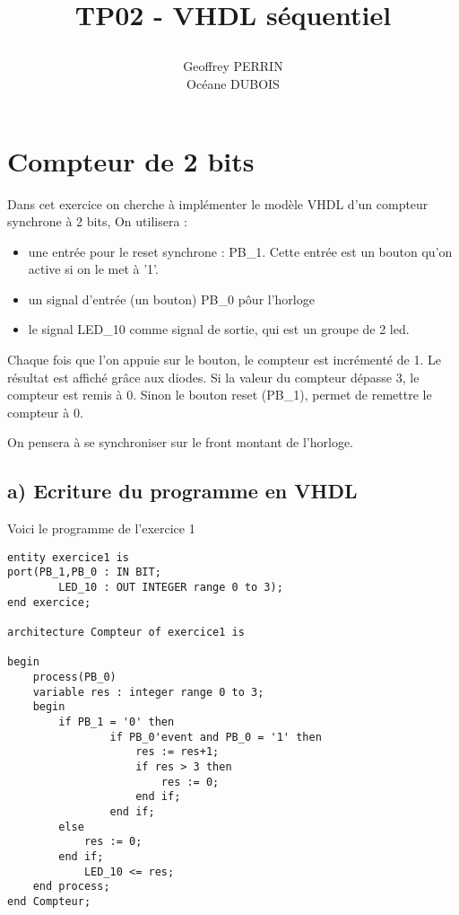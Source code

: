 \documentclass[11pt]{report}
\title{\textbf{TP02 - VHDL séquentiel}
\author{Geoffrey PERRIN \\ Océane DUBOIS\\}
\date{}}
\begin{document}
\maketitle

\newpage


\section{Compteur de 2 bits}

Dans cet exercice on cherche à implémenter le  modèle VHDL d'un compteur synchrone à 2 bits, 
On utilisera : \begin{itemize}
	 \item  une entrée  pour le reset synchrone : PB\_1. Cette entrée est un bouton qu'on active si on le met à '1'.
	\item un signal d'entrée (un bouton) PB\_0 pôur l'horloge 
	 \item le signal LED\_10 comme signal de sortie, qui est un groupe de 2 led.
	 
	\end{itemize}

\medskip

Chaque fois que l'on appuie sur le bouton, le compteur est incrémenté de 1. Le résultat est affiché grâce aux diodes. Si la valeur du compteur dépasse 3, le compteur est remis à 0. Sinon le bouton reset (PB\_1), permet de remettre le compteur à 0.

\medskip

On pensera à se synchroniser sur le front montant de l'horloge.

\subsection{ a) Ecriture du programme en VHDL}

Voici le programme de l'exercice 1

 \begin{lstlisting}
entity exercice1 is
port(PB_1,PB_0 : IN BIT;
		LED_10 : OUT INTEGER range 0 to 3);
end exercice;

architecture Compteur of exercice1 is

begin
	process(PB_0)
	variable res : integer range 0 to 3;
	begin	
		if PB_1 = '0' then
				if PB_0'event and PB_0 = '1' then 
					res := res+1;
					if res > 3 then
						res := 0;
					end if;
				end if;
		else
			res := 0;
		end if;
			LED_10 <= res;
	end process;
end Compteur;

 \end{lstlisting}
 
\end{document}
